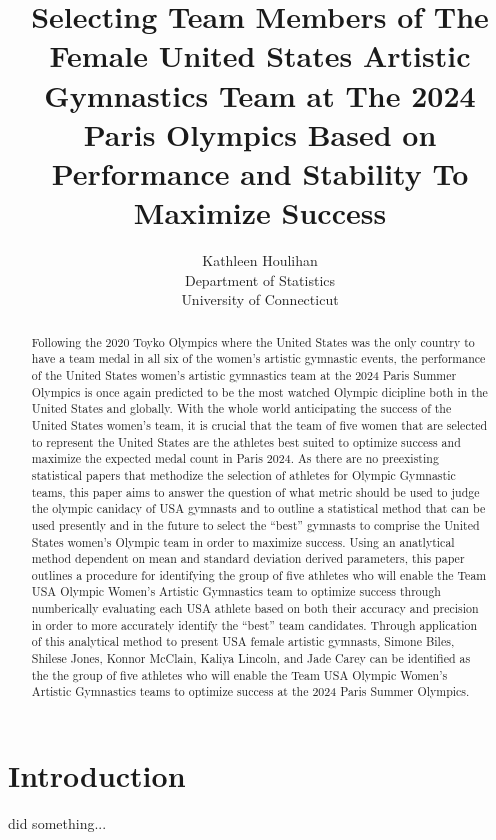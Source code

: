 \documentclass[12pt]{article}
\title{Selecting Team Members of The Female United States Artistic Gymnastics Team at The 2024 Paris Olympics 
Based on Performance and Stability To Maximize Success}
\author{Kathleen Houlihan\\
  Department of Statistics\\
  University of Connecticut
}
\begin{document}
\maketitle

\begin{abstract}
    
  Following the 2020 Toyko Olympics where the United States was the only country to have a team medal 
  in all six of the women's artistic gymnastic events, the performance of the United States women's artistic 
  gymnastics team at the 2024 Paris Summer Olympics is once again predicted to be the most watched Olympic 
  dicipline both in the United States and globally. With the whole world anticipating the success of the United 
  States women's team, it is crucial that the team of five women that are selected to represent the United States 
  are the athletes best suited to optimize success and maximize the expected medal count in Paris 2024. As there 
  are no preexisting statistical papers that methodize the selection of athletes for Olympic Gymnastic teams, 
  this paper aims to answer the question of what metric should be used to judge the olympic canidacy of USA 
  gymnasts and to outline a statistical method that can be used presently and in the future to select the ``best'' 
  gymnasts to comprise the United States women's Olympic team in order to maximize success. Using an anatlytical 
  method dependent on mean and standard deviation derived parameters, this paper outlines a procedure for identifying 
  the group of five athletes who will enable the Team USA Olympic Women’s Artistic Gymnastics team to optimize 
  success through numberically evaluating each USA athlete based on both their accuracy and precision in order to 
  more accurately identify the ``best'' team candidates. Through application of this analytical method to present 
  USA female artistic gymnasts, Simone Biles, Shilese Jones, Konnor McClain, Kaliya Lincoln, and Jade Carey can be 
  identified as the the group of five athletes who will enable the Team USA Olympic Women’s Artistic Gymnastics 
  teams to optimize success at the 2024 Paris Summer Olympics.

\end{abstract}

\section{Introduction}
\label{sec:intro}

\citet{JonasRohleder2023} did something...
\end{document}
